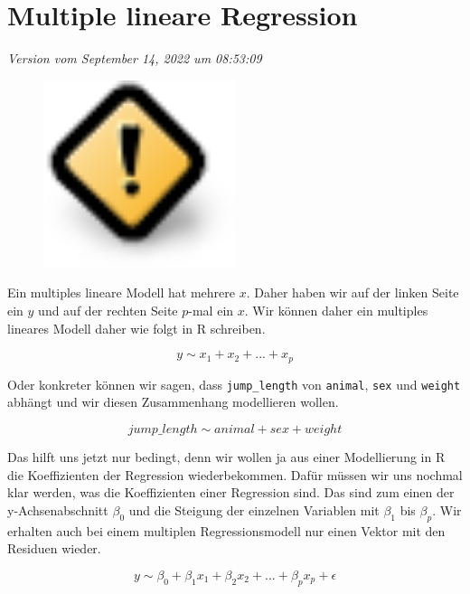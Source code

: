 \documentclass[
  letterpaper,
]{scrbook}
\begin{document}
\hypertarget{sec-mult-reg-basic}{%
\chapter{Multiple lineare Regression}\label{sec-mult-reg-basic}}

\emph{Version vom September 14, 2022 um 08:53:09}

\begin{figure}

{\centering \includegraphics[width=0.5\textwidth,height=\textheight]{./images/caution.png}

}

\end{figure}

Ein multiples lineare Modell hat mehrere \(x\). Daher haben wir auf der
linken Seite ein \(y\) und auf der rechten Seite \(p\)-mal ein \(x\).
Wir können daher ein multiples lineares Modell daher wie folgt in R
schreiben.

\[
y \sim x_1 + x_2 + ... + x_p 
\]

Oder konkreter können wir sagen, dass \texttt{jump\_length} von
\texttt{animal}, \texttt{sex} und \texttt{weight} abhängt und wir diesen
Zusammenhang modellieren wollen.

\[
jump\_length \sim animal + sex + weight 
\]

Das hilft uns jetzt nur bedingt, denn wir wollen ja aus einer
Modellierung in R die Koeffizienten der Regression wiederbekommen. Dafür
müssen wir uns nochmal klar werden, was die Koeffizienten einer
Regression sind. Das sind zum einen der y-Achsenabschnitt \(\beta_0\)
und die Steigung der einzelnen Variablen mit \(\beta_1\) bis
\(\beta_p\). Wir erhalten auch bei einem multiplen Regressionsmodell nur
einen Vektor mit den Residuen wieder.

\[
y \sim \beta_0 + \beta_1 x_1 + \beta_2 x_2 + ... + \beta_p x_p + \epsilon
\]
\end{document}
